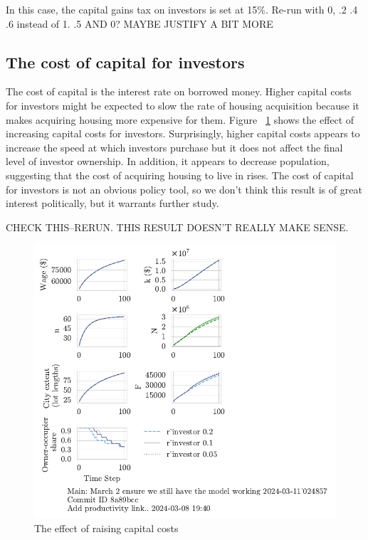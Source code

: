 In this case, the capital gains tax on investors is set at 15\%. {\color{red} Re-run with  0, .2 .4 .6 instead of 1. .5 AND 0? MAYBE JUSTIFY A BIT MORE}
 




\subsection{The cost of capital for investors}

The cost of capital is the interest rate on borrowed money. Higher capital costs for investors might be expected to slow the rate of housing acquisition because it makes acquiring housing more expensive for them. Figure ~\ref{fig:capital_ownership_trajectory} shows the effect of increasing capital costs for investors. Surprisingly, higher capital costs appears to increase the speed at which investors purchase but it does not affect the final level of investor ownership.  In addition, it appears to decrease population, suggesting that the cost of acquiring housing to live in rises. The cost of capital for investors is not an obvious policy tool, so we don't think this result is of great interest politically, but it warrants further study.

{\color{red} CHECK THIS--RERUN. THIS RESULT DOESN'T REALLY MAKE SENSE.}

\begin{figure}[h!t]
    \centering
    \includegraphics[scale=1., trim={0 1.4cm 0 0},clip]{fig/r_investor-Main-024857.pdf}
    \caption{The effect of raising capital costs}
    \label{fig:capital_ownership_trajectory}
\end{figure}

